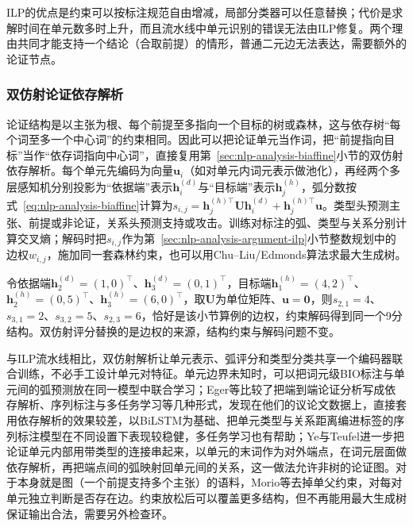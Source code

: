 ILP的优点是约束可以按标注规范自由增减，局部分类器可以任意替换；代价是求解时间在单元数多时上升，而且流水线中单元识别的错误无法由ILP修复。两个理由共同才能支持一个结论（合取前提）的情形，普通二元边无法表达，需要额外的论证节点。

\subsubsection{双仿射论证依存解析}
\label{sec:nlp-analysis-argument-biaffine}

论证结构是以主张为根、每个前提至多指向一个目标的树或森林，这与依存树“每个词至多一个中心词”的约束相同。因此可以把论证单元当作词，把“前提指向目标”当作“依存词指向中心词”，直接复用第~\ref{sec:nlp-analysis-biaffine}小节的双仿射依存解析。每个单元先编码为向量$\bm u_i$（如对单元内词元表示做池化），再经两个多层感知机分别投影为“依据端”表示$\bm h_i^{(d)}$与“目标端”表示$\bm h_j^{(h)}$，弧分数按式~\eqref{eq:nlp-analysis-biaffine}计算为$s_{i,j}=\bm h_j^{(h)\top}\bm U\bm h_i^{(d)}+\bm h_j^{(h)\top}\bm u$。类型头预测主张、前提或非论证，关系头预测支持或攻击。训练对标注的弧、类型与关系分别计算交叉熵；解码时把$s_{i,j}$作为第~\ref{sec:nlp-analysis-argument-ilp}小节整数规划中的边权$w_{i,j}$，施加同一套森林约束，也可以用Chu--Liu/Edmonds算法求最大生成树。

令依据端$\bm h_2^{(d)}=(1,0)^{\top}$、$\bm h_3^{(d)}=(0,1)^{\top}$，目标端$\bm h_1^{(h)}=(4,2)^{\top}$、$\bm h_2^{(h)}=(0,5)^{\top}$、$\bm h_3^{(h)}=(6,0)^{\top}$，取$\bm U$为单位矩阵、$\bm u=\bm 0$，则$s_{2,1}=4$、$s_{3,1}=2$、$s_{3,2}=5$、$s_{2,3}=6$，恰好是该小节算例的边权，约束解码得到同一个9分结构。双仿射评分替换的是边权的来源，结构约束与解码问题不变。

与ILP流水线相比，双仿射解析让单元表示、弧评分和类型分类共享一个编码器联合训练，不必手工设计单元对特征。单元边界未知时，可以把词元级BIO标注与单元间的弧预测放在同一模型中联合学习\cite{nlp-analysis-eger2017}；Eger等比较了把端到端论证分析写成依存解析、序列标注与多任务学习等几种形式，发现在他们的议论文数据上，直接套用依存解析的效果较差，以BiLSTM为基础、把单元类型与关系距离编进标签的序列标注模型在不同设置下表现较稳健，多任务学习也有帮助；Ye与Teufel进一步把论证单元内部用带类型的连接串起来，以单元的末词作为对外端点，在词元层面做依存解析，再把端点间的弧映射回单元间的关系，这一做法允许非树的论证图。对于本身就是图（一个前提支持多个主张）的语料，Morio等去掉单父约束，对每对单元独立判断是否存在边。约束放松后可以覆盖更多结构，但不再能用最大生成树保证输出合法，需要另外检查环。

